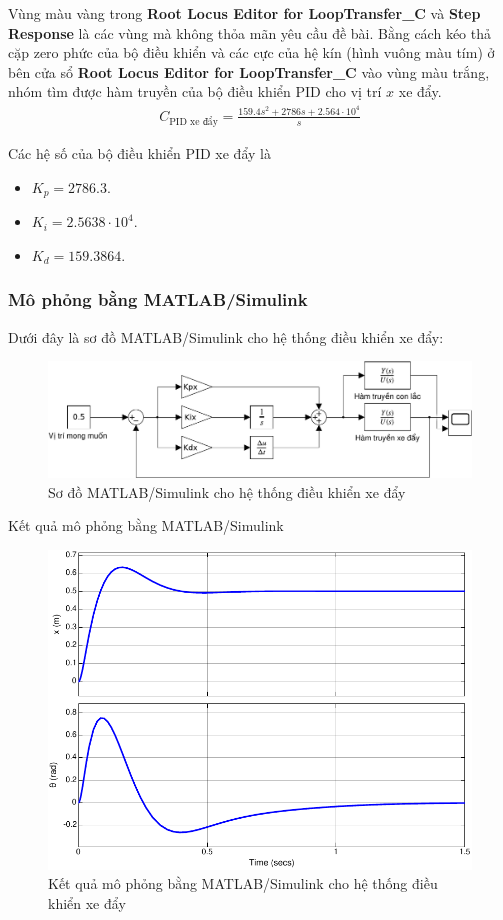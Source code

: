 \documentclass[12pt,a4paper]{article}
\begin{document}
Vùng màu vàng trong \textbf{Root Locus Editor for LoopTransfer\_C} và  \textbf{Step Response} là các vùng mà không thỏa mãn yêu cầu đề bài. Bằng cách kéo thả cặp zero phức của bộ điều khiển và các cực của hệ kín (hình vuông màu tím) ở bên cửa sổ \textbf{Root Locus Editor for LoopTransfer\_C} vào vùng màu trắng, nhóm tìm được hàm truyền của bộ điều khiển PID cho vị trí $x$ xe đẩy.
\begin{align}
    C_{\text{PID xe đẩy}} = \frac{159.4 s^2 + 2786 s + 2.564\cdot 10^4}{s}
\end{align}

Các hệ số của bộ điều khiển PID xe đẩy là
\begin{itemize}
    \item $K_p = 2786.3$.
    \item $K_i = 2.5638\cdot 10^4$.
    \item $K_d = 159.3864 $.
\end{itemize}

\subsubsection{Mô phỏng bằng MATLAB/Simulink}

Dưới đây là sơ đồ MATLAB/Simulink cho hệ thống điều khiển xe đẩy:
\begin{figure}[ht]
    \centering
    \includegraphics[width=\linewidth]{MATLAB_7.pdf}
    \caption{Sơ đồ MATLAB/Simulink cho hệ thống điều khiển xe đẩy}
\end{figure}

Kết quả mô phỏng bằng MATLAB/Simulink
\begin{figure}[ht]
    \centering
    \includegraphics[width=0.645\linewidth]{MATLAB_6.pdf}
    \caption{Kết quả mô phỏng bằng MATLAB/Simulink cho hệ thống điều khiển xe đẩy}
\end{figure}
\end{document}
